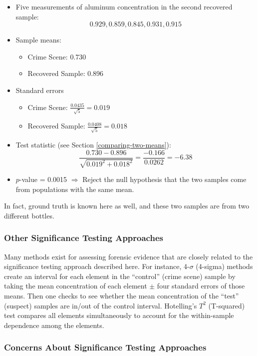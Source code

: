 \documentclass[]{book}
\providecommand{\tightlist}{%
  \setlength{\itemsep}{0pt}\setlength{\parskip}{0pt}}
\theoremstyle{definition}
\theoremstyle{definition}
\theoremstyle{remark}
\begin{document}
\begin{itemize}
\tightlist
\item
  Five measurements of aluminum concentration in the second recovered
  sample: \[0.929, 0.859, 0.845, 0.931, 0.915\]
\item
  Sample means:

  \begin{itemize}
  \tightlist
  \item
    Crime Scene: 0.730
  \item
    Recovered Sample: 0.896
  \end{itemize}
\item
  Standard errors

  \begin{itemize}
  \tightlist
  \item
    Crime Scene: \(\frac{0.0435}{\sqrt{5}}=0.019\)
  \item
    Recovered Sample: \(\frac{0.0408}{\sqrt{5}}=0.018\)
  \end{itemize}
\item
  Test statistic (see Section \ref{comparing-two-means}):
  \[\frac{0.730 - 0.896}{\sqrt{0.019^2 + 0.018^2}} = \frac{-0.166}{0.0262} = -6.38 \]
\item
  \(p\)-value = 0.0015 \(\Rightarrow\) Reject the null hypothesis that
  the two samples come from populations with the same mean.
\end{itemize}

In fact, ground truth is known here as well, and these two samples are
from two different bottles.

\subsubsection{Other Significance Testing
Approaches}\label{other-significance-testing-approaches}

Many methods exist for assessing forensic evidence that are closely
related to the significance testing approach described here. For
instance, 4-\(\sigma\) (4-sigma) methods create an interval for each
element in the ``control'' (crime scene) sample by taking the mean
concentration of each element \(\pm\) four standard errors of those
means. Then one checks to see whether the mean concentration of the
``test'' (suspect) samples are in/out of the control interval.
Hotelling's \(T^2\) (T-squared) test compares all elements
simultaneously to account for the within-sample dependence among the
elements.

\subsubsection{Concerns About Significance Testing
Approaches}\label{concerns-about-significance-testing-approaches}
\end{document}
